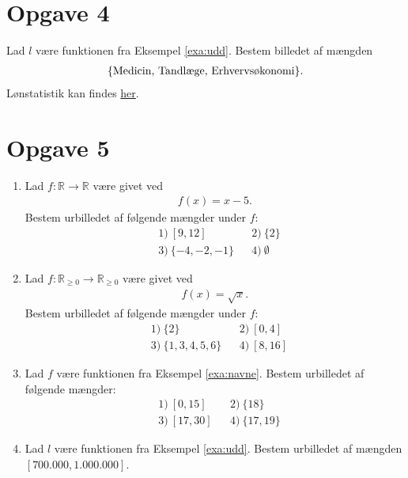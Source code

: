 \section*{Opgave 4}
Lad $l$ være funktionen fra Eksempel \ref{exa:udd}. Bestem billedet af mængden 
\begin{align*}
\{\textnormal{Medicin, Tandlæge, Erhvervsøkonomi}\}.
\end{align*}
Lønstatistik kan findes \href{https://cepos.dk/artikler/se-listen-hvilke-uddannelser-giver-den-hoejeste-indkomst/}{\color{blue!60} her}.

\section*{Opgave 5}
\begin{enumerate}[label=\roman*)]
\item Lad $f: \mathbb{R} \to \mathbb{R}$ være givet ved 
\begin{align*}
	f(x) = x-5.
\end{align*}
Bestem urbilledet af følgende mængder under $f$:
\begin{align*}
	&1) \  [9,12] &&2) \ \{2\}\\
	&3) \ \{-4,-2,-1\} &&4) \ \emptyset
\end{align*}

\item Lad $f:\mathbb{R}_{\geq 0} \to \mathbb{R}_{\geq 0}$ være givet ved
\begin{align*}
	f(x) = \sqrt{x}.
\end{align*}
Bestem urbilledet af følgende mængder under $f$:
\begin{align*}
	&1) \ \{2\}  &&2) \  [0,4] \\
	&3) \ \{1,3,4,5,6\} &&4) \ [8,16] 
\end{align*}

\item Lad $f$ være funktionen fra Eksempel \ref{exa:navne}. Bestem urbilledet af følgende mængder:
\begin{align*}
	&1) \ [0,15]  &&2) \ \{18\}  \\
	&3) \ [17,30] &&4) \ \{17,19\} 
\end{align*}
\item Lad $l$ være funktionen fra Eksempel \ref{exa:udd}. Bestem urbilledet af mængden $[700.000,1.000.000]$.
\end{enumerate}